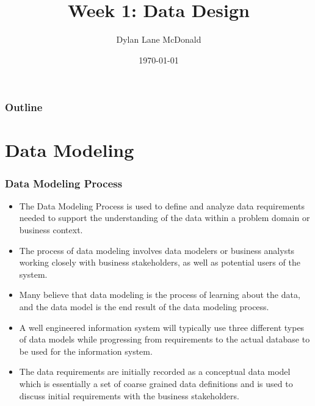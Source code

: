 \documentclass[aspectratio=169]{beamer}
\title{Week 1: Data Design}
\author{Dylan Lane McDonald}
\institute{CNM STEMulus Center\\Web Development with PHP}
\date{\today}
\begin{document}
\begin{frame}
\titlepage
\end{frame}

\begin{frame}
\frametitle{Outline}
\tableofcontents
\end{frame}

\section{Data Modeling}
\begin{frame}
\frametitle{Data Modeling Process}
\begin{itemize}
	\item The Data Modeling Process is used to define and analyze data requirements needed to support the understanding of the data within a problem domain or business context.
	\item The process of data modeling involves data modelers or business analysts working closely with business stakeholders, as well as potential users of the system.
	\item Many believe that data modeling is the process of learning about the data, and the data model is the end result of the data modeling process.
	\item A well engineered information system will typically use three different types of data models while progressing from requirements to the actual database to be used for the information system.
	\item The data requirements are initially recorded as a conceptual data model which is essentially a set of coarse grained data definitions and is used to discuss initial requirements with the business stakeholders. 
\end{itemize}
\end{frame}
\end{document}
